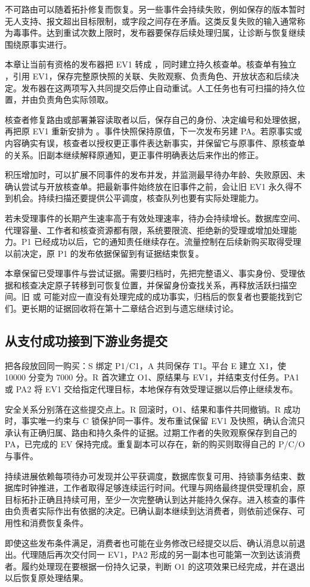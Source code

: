 不可路由可以随着拓扑修复而恢复。另一些事件会持续失败，例如保存的版本暂时无人支持、报文超出目标限制，或字段之间存在矛盾。这类反复失败的输入通常称为毒事件。达到重试次数上限时，发布器要保存后续处理归属，让诊断与恢复继续围绕原事实进行。

本章让当前有资格的发布器把 EV1 转成 ，同时建立持久核查单。核查单有独立 ，引用 EV1，保存完整原快照的关联、失败观察、负责角色、开放状态和后续决定。发布器在这两项写入共同提交后停止自动重试。人工任务也有可扫描的持久位置，并由负责角色实际领取。

核查者修复路由或部署兼容读取者以后，保存自己的身份、决定编号和处理依据，再把原 EV1 重新安排为 。事件快照保持原值，下一次发布另建 PA。若原事实或内容确实有误，核查者以授权更正事件表达新事实，并保留它与原事件、原核查单的关系。旧副本继续解释原通知，更正事件明确表达后来作出的修正。

积压增加时，可以扩展不同事件的发布并发，并监测最早待办年龄、失败原因、未确认尝试与开放核查单。把最新事件始终放在旧事件之前，会让旧 EV1 永久得不到机会。持续扫描还要提供公平调度，核查队列也要有实际处理能力。

若未受理事件的长期产生速率高于有效处理速率，待办会持续增长。数据库空间、代理容量、工作者和核查资源都有限，系统要限流、拒绝新的受理或增加处理能力。P1 已经成功以后，它的通知责任继续存在。流量控制在后续新购买取得受理以前决定，原 P1 的发布依据保留到有证据结束恢复。

本章保留已受理事件与尝试证据。需要归档时，先把完整语义、事实身份、受理依据和核查决定原子转移到可恢复位置，并保留身份查找关系，再释放活跃扫描空间。旧  或  可能对应一直没有处理完成的成功事实，归档后的恢复者也要能找到它们。更长期的证据回收将在第十二章结合迟到与遗忘继续讨论。



\clearpage
\subsection*{从支付成功接到下游业务提交}

把各段放回同一购买：S 绑定 P1/C1，A 共同保存 T1。平台 E 建立 X1，使 10000 分变为 7000 分。R 首次建立 O1、原结果与 EV1，并结束支付任务。PA1 或 PA2 将 EV1 交给指定代理目标，本地保存有效受理证据以后停止继续发布。

安全关系分别落在这些提交点上。R 回滚时，O1、结果和事件共同撤销。R 成功时，事实唯一约束与 C 锁保护同一事件。发布重试保留 EV1 及快照，确认合流只承认有正确归属、路由和持久条件的证据。过期工作者的失败观察保存到自己的 PA，已完成的 EV 保持完成。重复副本可以存在，新的购买则取得自己的 P/C/O 与事件。

持续进展依赖每项待办可发现并公平获调度，数据库恢复可用、持锁事务结束、数据库时钟推进，工作者取得足够连续运行时间。代理与网络最终提供受理机会，原目标拓扑正确且持续可用，至少一次完整确认到达并能持久保存。进入核查的事件由负责者实际作出有依据的决定。已确认副本继续到达消费者，则依前述保存、可用性和消费恢复条件。

即使这些发布条件满足，消费者也可能在业务修改已经提交以后、确认消息以前退出。代理随后再次交付同一 EV1，PA2 形成的另一副本也可能第一次到达该消费者。履约处理现在要根据一份持久记录，判断 O1 的这项效果已经完成，并在退出以后恢复原处理结果。
